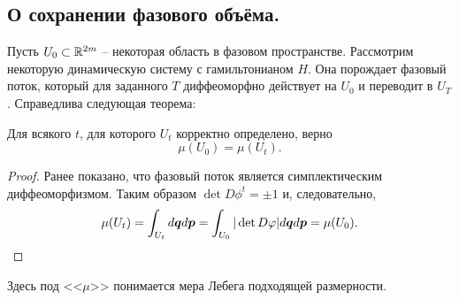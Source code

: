 \subsection{О сохранении фазового объёма.}
    Пусть $U_0 \subset \mathbb{R}^{2m}$ -- некоторая область в фазовом пространстве.
    Рассмотрим некоторую динамическую систему с гамильтонианом $H$.
    Она порождает фазовый поток, который для заданного $T$ диффеоморфно действует на $U_0$ и переводит в $U_T$.
    Справедлива следующая теорема:
    \begin{theorem}
        Для всякого $t$, для которого $U_t$ корректно определено, верно
        \[
            \mu(U_0) = \mu(U_t).
        \]

    \end{theorem}
    \begin{proof}
        Ранее показано, что фазовый поток является симплектическим диффеоморфизмом.
        Таким образом $\det D\phi^t = \pm 1$ и, следовательно, \[\mu(U_t) = \int_{U_t} d\boldsymbol{q}d\boldsymbol{p} = \int_{U_0} |\det D\varphi| d\boldsymbol{q}d\boldsymbol{p} = \mu(U_0).\]
    \end{proof}
\begin{note}
    Здесь под <<$\mu$>> понимается мера Лебега подходящей размерности.
\end{note}
